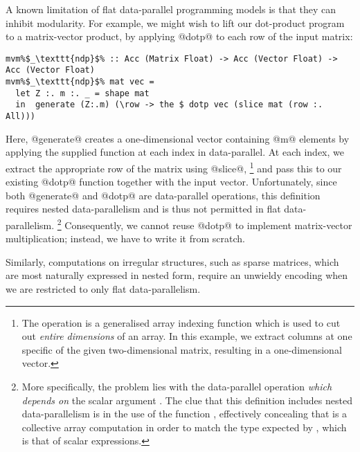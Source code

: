 A known limitation of flat data-parallel programming models is that they can
inhibit modularity. For example, we might wish to lift our dot-product program
to a matrix-vector product, by applying @dotp@ to each row of the input matrix:
%
\begin{lstlisting}
mvm%$_\texttt{ndp}$% :: Acc (Matrix Float) -> Acc (Vector Float) -> Acc (Vector Float)
mvm%$_\texttt{ndp}$% mat vec =
  let Z :. m :. _ = shape mat
  in  generate (Z:.m) (\row -> the $ dotp vec (slice mat (row :. All)))
\end{lstlisting}
%
Here, @generate@ creates a one-dimensional vector containing @m@ elements by
applying the supplied function at each index in data-parallel. At each index, we
extract the appropriate row of the matrix using @slice@,%
\footnote{The  operation is a generalised array indexing function
which is used to cut out \emph{entire dimensions} of an array. In this example,
we extract  columns at one specific  of the given
two-dimensional matrix, resulting in a one-dimensional vector.}
and pass this to our existing @dotp@ function together with the input vector.
Unfortunately, since both @generate@ and @dotp@ are data-parallel operations,
this definition requires nested data-parallelism and is thus not permitted in flat data-parallelism.%
\footnote{More specifically, the problem lies with the data-parallel operation
 \emph{which depends on} the scalar argument . The clue that
this definition includes nested data-parallelism is in the use of the function
, effectively concealing that 
is a collective array computation in order to match the type expected by
, which is that of scalar expressions.}
Consequently, we cannot reuse @dotp@ to implement matrix-vector multiplication; instead, we have to write it from scratch.

Similarly, computations on irregular structures, such as sparse matrices, which are most naturally expressed in nested form, require an unwieldy encoding when we are restricted to only flat data-parallelism.



